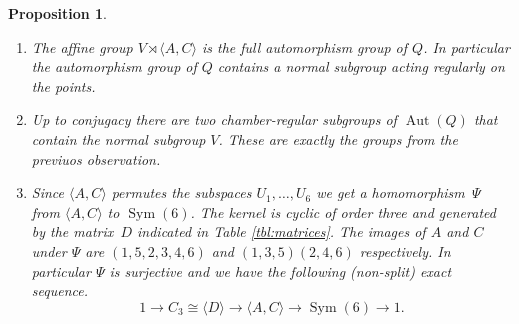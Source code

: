 \documentclass[dvipsnames]{article}
\newtheorem{proposition}[theorem]{Proposition}
\theoremstyle{definition}
\theoremstyle{remark}
\DeclareMathOperator{\Sym}{Sym}
\DeclareMathOperator{\Aut}{Aut}
\begin{document}
    \begin{proposition}
        \begin{enumerate}
            \item 
            The affine group $V \rtimes \langle A,C\rangle$ is the full automorphism group of $Q$. In particular the automorphism group of $Q$ contains a normal subgroup acting regularly on the points.
            \item
            Up to conjugacy there are two chamber-regular subgroups of $\Aut(Q)$ that contain the normal subgroup $V$. These are exactly the groups from the previuos observation.
            \item
            Since $\langle A,C\rangle$ permutes the subspaces $U_1, \dots, U_6$ we get a homomorphism~$\Psi$ from $\langle A, C\rangle$ to $\Sym(6)$. The kernel is cyclic of order three and generated by the matrix~$D$ indicated in Table \ref{tbl:matrices}. The images of $A$ and $C$ under $\Psi$ are $(1,5,2,3,4,6)$ and $(1,3,5)(2,4,6)$ respectively. In particular $\Psi$ is surjective and we have the following (non-split) exact sequence.
            \[
                1 \rightarrow C_3 \cong \langle D \rangle \rightarrow \langle A,C\rangle \rightarrow \Sym(6) \rightarrow 1.
            \]
        \end{enumerate}
    \end{proposition}
\end{document}
